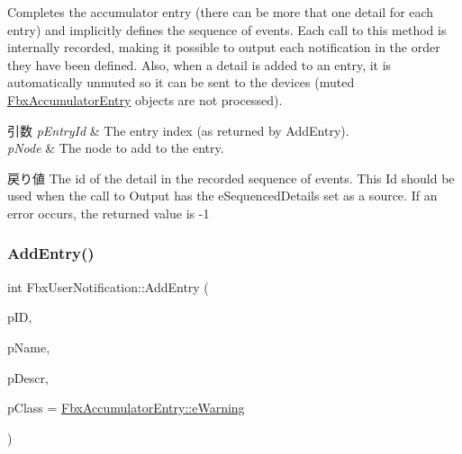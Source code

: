Completes the accumulator entry (there can be more that one detail for each entry) and implicitly defines the sequence of events. Each call to this method is internally recorded, making it possible to output each notification in the order they have been defined. Also, when a detail is added to an entry, it is automatically unmuted so it can be sent to the devices (muted \hyperlink{class_fbx_accumulator_entry}{Fbx\+Accumulator\+Entry} objects are not processed). 
\begin{DoxyParams}{引数}
{\em p\+Entry\+Id} & The entry index (as returned by Add\+Entry). \\
\hline
{\em p\+Node} & The node to add to the entry. \\
\hline
\end{DoxyParams}
\begin{DoxyReturn}{戻り値}
The id of the detail in the recorded sequence of events. This Id should be used when the call to Output has the e\+Sequenced\+Details set as a source. If an error occurs, the returned value is -\/1 
\end{DoxyReturn}
\mbox{\label{class_fbx_user_notification_afc393d96ae3c3d826f3947507dcaa656}} 
\subsubsection{\texorpdfstring{Add\+Entry()}{AddEntry()}}
{\footnotesize\ttfamily int Fbx\+User\+Notification\+::\+Add\+Entry (\begin{DoxyParamCaption}\item[{const int}]{p\+ID,  }\item[{const \hyperlink{class_fbx_string}{Fbx\+String} \&}]{p\+Name,  }\item[{const \hyperlink{class_fbx_string}{Fbx\+String} \&}]{p\+Descr,  }\item[{\hyperlink{class_fbx_accumulator_entry_af08af3ddcbf7e8fe642d7e9ecb4ad0e2}{Fbx\+Accumulator\+Entry\+::\+E\+Class}}]{p\+Class = {\ttfamily \hyperlink{class_fbx_accumulator_entry_af08af3ddcbf7e8fe642d7e9ecb4ad0e2a02238ae4f2cce7a190dad59cfb3e9c19}{Fbx\+Accumulator\+Entry\+::e\+Warning}} }\end{DoxyParamCaption})}

